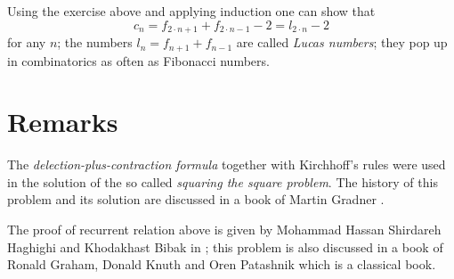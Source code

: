 Using the exercise above and applying induction one can show that 
\[c_n=f_{2\cdot n+1}+f_{2\cdot n-1}-2=l_{2\cdot  n}-2\]
for any $n$;
the numbers $l_n=f_{n+1}+f_{n-1}$ are called \emph{Lucas numbers};
they pop up in combinatorics as often as Fibonacci numbers.  

\section*{Remarks}

The \emph{delection-plus-contraction formula} together with Kirchhoff's rules were used in the solution of the so called \emph{squaring the square problem}.
The history of this problem and its solution are discussed in a book of Martin Gradner \cite[Chapter 17]{gardiner}.

The proof of recurrent relation above is given by Mohammad Hassan Shirdareh Haghighi and Khodakhast Bibak in \cite{haghighi-bibak};
this problem is also discussed in a book of  Ronald Graham, Donald Knuth and Oren Patashnik \cite{knut} which is a classical book.
